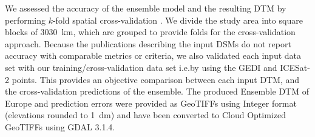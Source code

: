We assessed the accuracy of the ensemble model and the resulting DTM by performing $k$-fold spatial cross-validation \citep{lovelace2019geocomputation}. We divide the study area into square blocks of 30{\texttimes}30~km, which are grouped to provide folds for the cross-validation approach. Because the publications describing the input DSMs do not report accuracy with comparable metrics or criteria, we also validated each input data set with our training/cross-validation data set i.e.\@ by using the GEDI and ICESat-2 points. This provides an objective comparison between each input DTM, and the cross-validation predictions of the ensemble. The produced Ensemble DTM of Europe and prediction errors were provided as GeoTIFFs using Integer format (elevations rounded to 1~dm) and have been converted to Cloud Optimized GeoTIFFs using GDAL 3.1.4.

\begin{table}[t]
\caption{Overview of data sets used as input for the ensemble that produced our DTM}
\label{tab:input-for-dtm}
%
\end{table}

